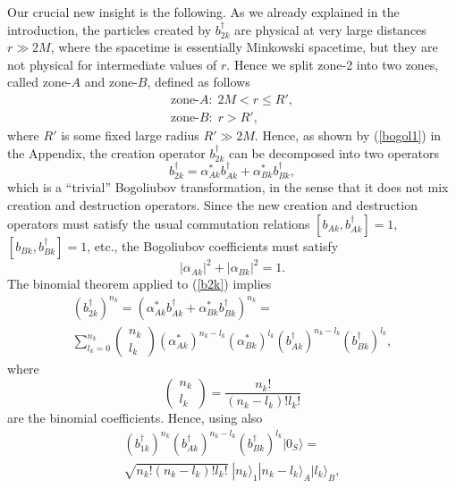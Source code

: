 \documentclass[aps,prd,onecolumn,groupedaddress,showkeys,12pt]{revtex4-2}
\begin{document}
Our crucial new insight is the following. As we already explained in the introduction,
the particles created by $b_{2k}^\dagger$ are physical at very large distances $r\gg 2M$, 
where the spacetime is essentially Minkowski spacetime, but they are not physical for intermediate values of $r$.
Hence we split zone-2 into two zones, called zone-$A$ and zone-$B$, defined as follows
\begin{equation}
\begin{array}{l}
 \text{zone-}A: \; 2M<r\le R', 
\\
 \text{zone-}B: \; r>R', 
\end{array}
\end{equation}
where $R'$ is some fixed large radius $R'\gg 2M$. Hence, as shown by (\ref{bogol1}) in the Appendix, 
the creation operator $b_{2k}^\dagger$ can be decomposed into two operators 
\begin{equation}\label{b2k}
 b_{2k}^\dagger=\alpha_{Ak}^*b_{Ak}^\dagger + \alpha_{Bk}^*b_{Bk}^\dagger ,
\end{equation}
which is a ``trivial'' Bogoliubov transformation, in the sense that it does not mix creation and destruction operators.
Since the new creation and destruction operators must satisfy the usual commutation relations 
$[b_{Ak}, b_{Ak}^\dagger]=1$, $[b_{Bk}, b_{Bk}^\dagger]=1$, etc., the Bogoliubov coefficients must satisfy
\begin{equation}\label{sum_alpha=1}
 |\alpha_{Ak}|^2+|\alpha_{Bk}|^2 =1. 
\end{equation}
The binomial theorem applied to (\ref{b2k}) implies
\begin{eqnarray}
 &  (b_{2k}^\dagger)^{n_k}  = (\alpha_{Ak}^*b_{Ak}^\dagger + \alpha_{Bk}^*b_{Bk}^\dagger)^{n_k} =&
\\
& \displaystyle\sum_{l_k=0}^{n_k} \left( \begin{array}{c} n_k \\ l_k \end{array} \right) 
(\alpha_{Ak}^*)^{n_k-l_k} (\alpha_{Bk}^*)^{l_k}  (b_{Ak}^\dagger)^{n_k-l_k}  (b_{Bk}^\dagger)^{l_k} ,
\nonumber
\end{eqnarray}
where 
\begin{equation}
 \left( \begin{array}{c} n_k \\ l_k \end{array} \right) =\frac{n_k!}{(n_k-l_k)!l_k!}
\end{equation}
are the binomial coefficients. Hence, using also 
\begin{eqnarray}
& (b_{1k}^\dagger)^{n_k} (b_{Ak}^\dagger)^{n_k-l_k} (b_{Bk}^\dagger)^{l_k} |0_S\rangle = &
\nonumber \\
&\sqrt{n_k! (n_k-l_k)! l_k!}\; |n_k\rangle_1 |n_k-l_k\rangle_A |l_k\rangle_B , &
\end{eqnarray}
\end{document}
